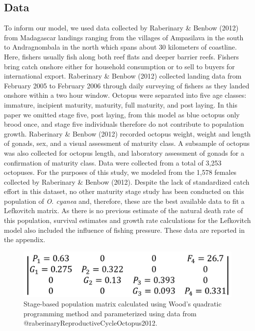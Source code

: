 \documentclass[
]{article}
\begin{document}
\hypertarget{data}{%
\subsection{Data}\label{data}}

To inform our model, we used data collected by Raberinary \& Benbow (2012) from Madagascar landings ranging from the villages of Ampasilava in the south to Andragnombala in the north which spans about 30 kilometers of coastline. Here, fishers usually fish along both reef flats and deeper barrier reefs. Fishers bring catch onshore either for household consumption or to sell to buyers for international export. Raberinary \& Benbow (2012) collected landing data from February 2005 to February 2006 through daily surveying of fishers as they landed onshore within a two hour window. Octopus were separated into five age classes: immature, incipient maturity, maturity, full maturity, and post laying. In this paper we omitted stage five, post laying, from this model as blue octopus only brood once, and stage five individuals therefore do not contribute to population growth. Raberinary \& Benbow (2012) recorded octopus weight, weight and length of gonads, sex, and a visual assessment of maturity class. A subsample of octopus was also collected for octopus length, and laboratory assessment of gonads for a confirmation of maturity class. Data were collected from a total of 3,253 octopuses. For the purposes of this study, we modeled from the 1,578 females collected by Raberinary \& Benbow (2012). Despite the lack of standardized catch effort in this dataset, no other maturity stage study has been conducted on this population of \emph{O. cyanea} and, therefore, these are the best available data to fit a Lefkovitch matrix. As there is no previous estimate of the natural death rate of this population, survival estimates and growth rate calculations for the Lefkovitch model also included the influence of fishing pressure. These data are reported in the appendix.

\begin{figure}
\includegraphics[width=1\linewidth]{MtxFilled} \caption{Stage-based population matrix calculated using Wood's quadratic programming method and parameterized using data from @raberinaryReproductiveCycleOctopus2012. \label{WriteMtxRounded}}\label{fig:WriteMtxRounded}
\end{figure}
\end{document}
